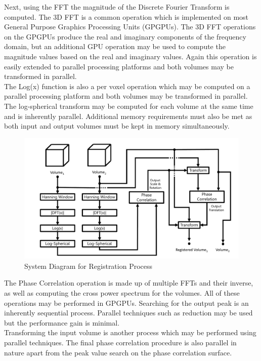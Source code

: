 Next, using the FFT the magnitude of the Discrete Fourier Transform is computed. The 3D FFT is a common operation which is implemented on most General Purpose Graphics Processing Units (GPGPUs). The 3D FFT operations on the GPGPUs produce the real and imaginary components of the frequency domain, but an additional GPU operation may be used to compute the magnitude values based on the real and imaginary values. Again this operation is easily extended to parallel processing platforms and both volumes may be transformed in parallel. \\

The Log(x) function is also a per voxel operation which may be computed on a parallel processing platform and both volumes may be transformed in parallel. The log-spherical transform may be computed for each volume at the same time and is inherently parallel. Additional memory requirements must also be met as both input and output volumes must be kept in memory simultaneously. \\

\begin{figure}[!htb]
\centering
\includegraphics[width=6.0in]{images/ch2/pipeline2}
\caption{System Diagram for Registration Process}
\label{fig:PIPELINENo1}
\end{figure}


The Phase Correlation operation is made up of multiple FFTs and their inverse, as well as computing the cross power spectrum for the volumes. All of these operations may be performed in GPGPUs. Searching for the output peak is an inherently sequential process. Parallel techniques such as reduction may be used but the performance gain is minimal. \\

Transforming the input volume is another process which may be performed using parallel techniques. The final phase correlation procedure is also parallel in nature apart from the peak value search on the phase correlation surface. \\



